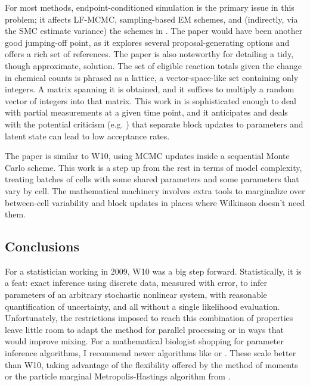 \documentclass{article}
\begin{document}
For most methods, endpoint-conditioned simulation is the primary issue in this problem; it affects LF-MCMC, sampling-based EM schemes, and (indirectly, via the SMC estimate variance) the schemes in \cite{golightly2011bayesian,owen2014scalable}. The paper \cite{golightly2014smc_b_subtilis} would have been another good jumping-off point, as it explores several proposal-generating options and offers a rich set of references. The paper \cite{amrein2012rate} is also noteworthy for detailing a tidy, though approximate, solution. The set of eligible reaction totals given the change in chemical counts is phrased as a lattice, a vector-space-like set containing only integers. A matrix spanning it is obtained, and it suffices to multiply a random vector of integers into that matrix. This work in \cite{amrein2012rate} is sophisticated enough to deal with partial measurements at a given time point, and it anticipates and deals with the potential criticism (e.g. \cite{golightly2011bayesian}) that separate block updates to parameters and latent state can lead to low acceptance rates.

The paper \cite{zechner2014scalable} is similar to W10, using MCMC updates inside a sequential Monte Carlo scheme. This work is a step up from the rest in terms of model complexity, treating batches of cells with some shared parameters and some parameters that vary by cell. The mathematical machinery involves extra tools to marginalize over between-cell variability and block updates in places where Wilkinson doesn't need them. 

\subsection{Conclusions}
For a statistician working in 2009, W10 was a big step forward. Statistically, it is a feat: exact inference using discrete data, measured with error, to infer parameters of an arbitrary stochastic nonlinear system, with reasonable quantification of uncertainty, and all without a single likelihood evaluation. Unfortunately, the restrictions imposed to reach this combination of properties leave little room to adapt the method for parallel processing or in ways that would improve mixing. For a mathematical biologist shopping for parameter inference algorithms, I recommend newer algorithms like \cite{owen2014scalable}%
 or \cite{zechner2014scalable}. These scale better than W10, taking advantage of the flexibility offered by the method of moments or the particle marginal Metropolis-Hastings algorithm from \cite{andrieu2010particle}.
\end{document}
